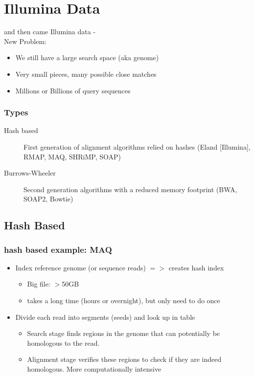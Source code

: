 \documentclass[pdf]{beamer}
\begin{document}
\section{Illumina Data}
\begin{frame}
and then came Illumina data -\\
New Problem:\\
\begin{itemize}
\item We still have a large search space (aka genome)
\item Very small pieces, many possible close matches
\item Millions or Billions of query sequences
\end{itemize}
\end{frame}

\begin{frame}
  \frametitle{Types}
  \begin{description}
  \item[Hash based] First generation of alignment algorithms relied on hashes (Eland [Illumina], RMAP, MAQ, SHRiMP, SOAP)
  \item [Burrows-Wheeler] Second generation algorithms with a reduced memory footprint (BWA, SOAP2, Bowtie)
  \end{description}
\end{frame}


\subsection{Hash Based}
\begin{frame}
  \frametitle{hash based example: MAQ}
  \begin{itemize}
  \item  Index reference genome (or sequence reads) $=>$ creates hash index       
  \begin{itemize}
   \item Big file: $>$50GB 
   \item takes a long time (hours or overnight), but only need to do once
  \end{itemize}
  \item Divide each read into segments (seeds) and look up in table
  \begin{itemize}
  \item Search stage finds regions in the genome that can potentially be homologous to the read. 
  \item Alignment stage verifies these regions to check if they are indeed homologous. More computationally intensive
  \end{itemize}
  \end{itemize}
\end{frame}
\end{document}
